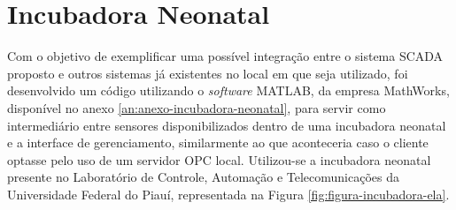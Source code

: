         \begin{figure}[!h]
    	\end{figure}
    	


\section{Incubadora Neonatal}
\label{sec:incubadora-neonatal}
Com o objetivo de exemplificar uma possível integração entre o sistema \gls{SCADA} proposto e outros sistemas já existentes no local em que seja utilizado, foi desenvolvido um código utilizando o \textit{software} MATLAB, da empresa MathWorks, disponível no anexo \ref{an:anexo-incubadora-neonatal}, para servir como intermediário entre sensores disponibilizados dentro de uma incubadora neonatal e a interface de gerenciamento, similarmente ao que aconteceria caso o cliente optasse pelo uso de um servidor \gls{OPC} local. Utilizou-se a incubadora neonatal presente no Laboratório de Controle, Automação e Telecomunicações da Universidade Federal do Piauí, representada na Figura \ref{fig:figura-incubadora-ela}.

        \begin{figure}[!h]
    	\end{figure}
    	
